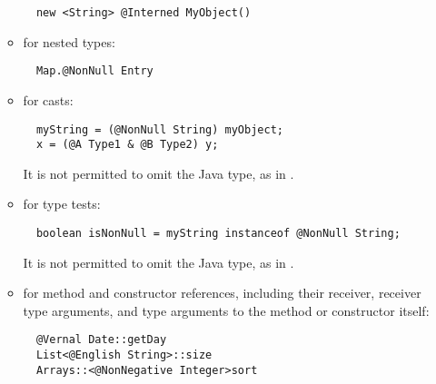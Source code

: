 \documentclass[10pt]{article}
\newcommand{\preverbnegspace}{\vspace{-5pt}}
\begin{document}
\begin{enumerate}
\begin{itemize}
\preverbnegspace
\begin{Verbatim}
  new <String> @Interned MyObject()
\end{Verbatim}

\item for nested types:
\preverbnegspace
\begin{Verbatim}
  Map.@NonNull Entry
\end{Verbatim}

\item for casts:
\preverbnegspace
\begin{Verbatim}
  myString = (@NonNull String) myObject;
  x = (@A Type1 & @B Type2) y;
\end{Verbatim}
\preverbnegspace
It is not permitted to omit the Java type, as in
.

\item for type tests:
\preverbnegspace
\begin{Verbatim}
  boolean isNonNull = myString instanceof @NonNull String;
\end{Verbatim}
\preverbnegspace
It is not permitted to omit the Java type, as in
.

\item for method and constructor references, including their receiver,
  receiver type arguments, and type arguments to the method or constructor
  itself:
\preverbnegspace
\begin{Verbatim}
  @Vernal Date::getDay
  List<@English String>::size
  Arrays::<@NonNegative Integer>sort
\end{Verbatim}



\end{itemize}


\end{enumerate}
\end{document}
